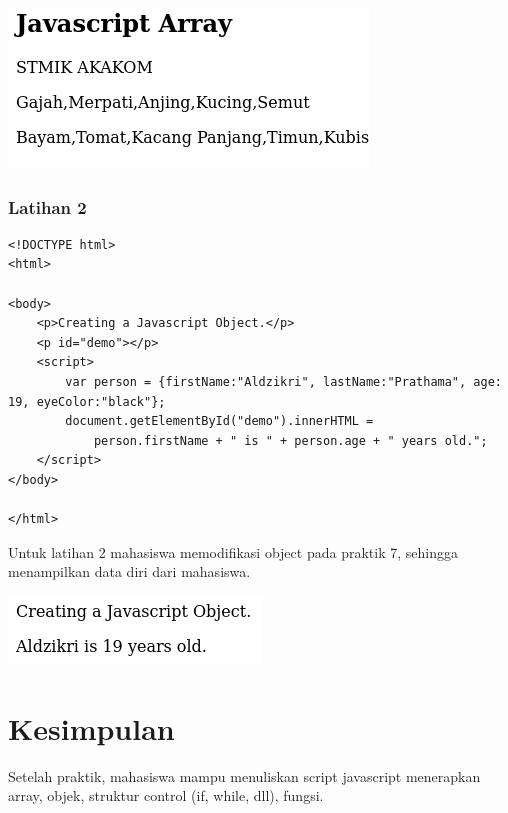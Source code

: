 \documentclass[a4paper,12pt]{article}
\begin{document}
\begin{center}
    \includegraphics[scale=.7]{8.png} 
\end{center}

\subsubsection{Latihan 2}
\begin{lstlisting}
<!DOCTYPE html>
<html>

<body>
    <p>Creating a Javascript Object.</p>
    <p id="demo"></p>
    <script>
        var person = {firstName:"Aldzikri", lastName:"Prathama", age: 19, eyeColor:"black"};
        document.getElementById("demo").innerHTML =
            person.firstName + " is " + person.age + " years old.";
    </script>
</body>

</html>
\end{lstlisting}

Untuk latihan 2 mahasiswa memodifikasi object pada praktik 7, sehingga menampilkan data diri dari mahasiswa.

\begin{center}
    \includegraphics[scale=.7]{9.png} 
\end{center}

\newpage

\section{Kesimpulan}
Setelah praktik, mahasiswa mampu menuliskan script javascript menerapkan array, objek, struktur control (if, while, dll), fungsi.
\end{document}

